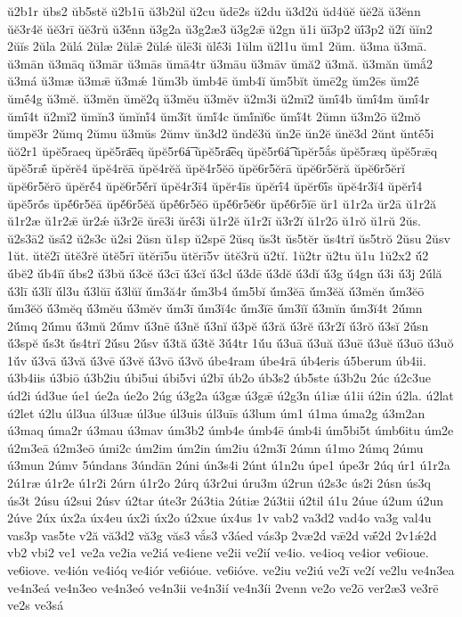{ŭ2b1r
ŭbs2
ŭb5stĕ
ŭ2b1ū
ŭ3b2ŭl
ŭ2cu
ŭdē2s
ŭ2du
ŭ3d2ŭ
ŭd4ŭĕ
ŭĕ2ă
ŭ3ĕnn
ŭĕ3r4ĕ
ŭĕ3rī
ŭĕ3rŭ
ŭ3ĕ́nn
ŭ3g2a
ŭ3g2æ3
ŭ3g2ǣ
ŭ2gn
ŭ1i
ŭī3p2
ŭī́3p2
ŭ2ĭ
ŭĭn2
2ŭĭs
2ŭla
2ŭlá
2ŭlæ
2ŭlǣ
2ŭlǽ
ŭlē3i
ŭlḗ3i
1ŭlm
ŭ2l1u
ŭm1
2ŭm.
ŭ3ma
ŭ3mā.
ŭ3mān
ŭ3māq
ŭ3mār
ŭ3mās
ŭmā4tr
ŭ3māu
ŭ3māv
ŭmă2
ŭ3mă.
ŭ3măn
ŭmắ2
ŭ3má
ŭ3mæ
ŭ3mǣ
ŭ3mǽ
1ŭm3b
ŭmb4ē
ŭmb4ĭ
ŭm5bĭt
ŭmē2g
ŭm2ēs
ŭm2ḗ
ŭmḗ4g
ŭ3mĕ.
ŭ3mĕn
ŭmĕ2q
ŭ3mĕu
ŭ3mĕv
ŭ2m3i
ŭ2mī2
ŭmī́4b
ŭmī́4m
ŭmī́4r
ŭmī́4t
ŭ2mĭ2
ŭmĭn3
ŭmĭnĭ́4
ŭm3ĭt
ŭmĭ́4c
ŭmĭ́nĭ6c
ŭmĭ́4t
2ŭmn
ŭ3m2ō
ŭ2mŏ
ŭmpĕ3r
2ŭmq
2ŭmu
ŭ3mŭs
2ŭmv
ŭn3d2
ŭndĕ3ŭ
ŭn2ē
ŭn2ĕ
ŭnĕ3d
2ŭnt
ŭntḗ5i
ŭŏ2r1
ŭpĕ5raeq
ŭpĕ5ra͞eq
ŭpĕ5r6á͞
ŭpĕ5ra͡eq
ŭpĕ5r6á͡
ŭpĕr5ắs
ŭpĕ5ræq
ŭpĕ5rǣq
ŭpĕ5rǣ́
ŭpĕrĕ4
ŭpĕ4rĕā
ŭpĕ4rĕă
ŭpĕ4r5ĕō
ŭpĕ6r5ĕrā
ŭpĕ6r5ĕră
ŭpĕ6r5ĕrĭ
ŭpĕ6r5ĕrō
ŭpĕrĕ́4
ŭpĕ6r5ĕ́rĭ
ŭpĕ4r3ī4
ŭpĕr4īs
ŭpĕrī́4
ŭpĕr6ī́s
ŭpĕ4r3ĭ4
ŭpĕrĭ́4
ŭpĕ5rṓs
ŭpĕ́6r5ĕā
ŭpĕ́6r5ĕă
ŭpĕ́6r5ĕō
ŭpĕ́6r5ĕ6r
ŭpĕ́6r5ĭē
ŭr1
ŭ1r2a
ŭr2ā
ŭ1r2ă
ŭ1r2æ
ŭ1r2ǣ
ŭr2ǽ
ŭ3r2ē
ŭrē3i
ŭrḗ3i
ŭ1r2ĕ
ŭ1r2ī
ŭ3r2ĭ
ŭ1r2ō
ŭ1rŏ
ŭ1rŭ
2ŭs.
ŭ2s3ā2
ŭsā́2
ŭ2s3c
ŭ2si
2ŭsn
ŭ1sp
ŭ2spē
2ŭsq
ŭs3t
ŭs5tĕr
ŭs4trĭ
ŭs5trŏ
2ŭsu
2ŭsv
1ŭt.
ŭtĕ2ī
ŭtĕ3rĕ
ŭtĕ5rī
ŭtĕrī5u
ŭtĕrī5v
ŭtĕ3rŭ
ŭ2tĭ.
1ŭ2tr
ŭ2tu
ŭ1u
1ŭ2x2
ŭ́2
ŭ́bĕ2
ŭ́b4ĭī
ŭ́bs2
ŭ́3bŭ
ŭ́3cĕ
ŭ́3cī
ŭ́3cĭ
ŭ́3cl
ŭ́3dē
ŭ́3dĕ
ŭ́3dĭ
ŭ́3g
ŭ́4gn
ŭ́3i
ŭ́3j
2ŭ́lă
ŭ́3lī
ŭ́3lĭ
ŭ́l3u
ŭ́3lŭī
ŭ́3lŭĭ
ŭ́m3ă4r
ŭ́m3b4
ŭ́m5bĭ
ŭ́m3ĕā
ŭ́m3ĕă
ŭ́3mĕn
ŭ́m3ĕō
ŭ́m3ĕŏ
ŭ́3mĕq
ŭ́3mĕu
ŭ́3mĕv
ŭ́m3ī
ŭ́m3ĭ4c
ŭ́m3ĭē
ŭ́m3ĭĭ
ŭ́3mĭn
ŭ́m3ĭ4t
2ŭ́mn
2ŭ́mq
2ŭ́mu
ŭ́3mŭ
2ŭ́mv
ŭ́3nē
ŭ́3nĕ
ŭ́3nĭ
ŭ́3pĕ
ŭ́3ră
ŭ́3rĕ
ŭ́3r2ĭ
ŭ́3rŏ
ŭ́3sĭ
2ŭ́sn
ŭ́3spĕ
ŭ́s3t
ŭ́s4trĭ
2ŭ́su
2ŭ́sv
ŭ́3tă
ŭ́3tĕ
3ŭ́4tr
1ŭ́u
ŭ́3uā
ŭ́3uă
ŭ́3uē
ŭ́3uĕ
ŭ́3uō
ŭ́3uŏ
1ŭ́v
ŭ́3vā
ŭ́3vă
ŭ́3vē
ŭ́3vĕ
ŭ́3vō
ŭ́3vŏ
úbe4ram
úbe4rā
úb4eris
ú5berum
úb4ii.
ú3b4iis
ú3biō
ú3b2iu
úbi5ui
úbi5vi
ú2bī
úb2o
úb3s2
úb5ste
ú3b2u
2úc
ú2c3ue
úd2i
úd3ue
úe1
úe2a
úe2o
2úg
ú3g2a
ú3gæ
ú3gǣ
ú2g3n
ú1iæ
ú1ii
ú2in
ú2la.
ú2lat
ú2let
ú2lu
úl3ua
úl3uæ
úl3ue
úl3uis
úl3uīs
ú3lum
úm1
ú1ma
úma2g
ú3m2an
ú3maq
úma2r
ú3mau
ú3mav
úm3b2
úmb4e
úmb4ē
úmb4i
úm5bi5t
úmb6itu
úm2e
ú2m3eā
ú2m3eō
úmi2c
úm2im
úm2in
úm2iu
ú2m3ī
2úmn
ú1mo
2úmq
2úmu
ú3mun
2úmv
5úndans
3úndān
2úni
ún3s4i
2únt
ú1n2u
úpe1
úpe3r
2úq
úr1
ú1r2a
2ú1ræ
ú1r2e
ú1r2i
2úrn
ú1r2o
2úrq
ú3r2ui
úru3m
ú2run
ú2s3c
ús2i
2úsn
ús3q
ús3t
2úsu
ú2sui
2úsv
ú2tar
úte3r
2ú3tia
2útiæ
2ú3tii
ú2til
ú1u
2úue
ú2um
ú2un
2úve
2úx
úx2a
úx4eu
úx2i
úx2o
ú2xue
úx4us
1v
vab2
va3d2
vad4o
va3g
val4u
vas3p
vas5te
v2ă
vă3d2
vă3g
văs3
vắs3
v3áed
vás3p
2væ2d
vǣ2d
vǣ́2d
2v1ǽ2d
vb2
vbi2
ve1
ve2a
ve2ia
ve2iá
ve4iene
ve2ii
ve2ií
ve4io.
ve4ioq
ve4ior
ve6ioue.
ve6iove.
ve4ión
ve4ióq
ve4iór
ve6ióue.
ve6ióve.
ve2iu
ve2iú
ve2ī
ve2í
ve2lu
ve4n3ea
ve4n3eá
ve4n3eo
ve4n3eó
ve4n3ii
ve4n3ií
ve4n3íi
2venn
ve2o
ve2ō
ver2æ3
ve3rē
ve2s
ve3sá
}

